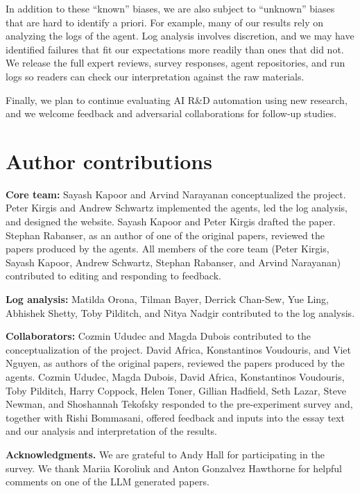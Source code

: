 In addition to these ``known'' biases, we are also subject to ``unknown''
biases that are hard to identify a priori. For example, many of our results
rely on analyzing the logs of the agent. Log analysis involves discretion, and
we may have identified failures that fit our expectations more readily than
ones that did not. We release the full expert reviews, survey responses, agent
repositories, and run logs so readers can check our interpretation against the
raw materials.

Finally, we plan to continue evaluating AI R\&D automation using new research, and we welcome feedback and adversarial collaborations for follow-up studies.

\section*{Author contributions}


\textbf{Core team:} Sayash Kapoor and Arvind Narayanan conceptualized the
project. Peter Kirgis and Andrew Schwartz implemented the agents, led the log
analysis, and designed the website. Sayash Kapoor and Peter Kirgis drafted the
paper. Stephan Rabanser, as an author of one of the original papers, reviewed
the papers produced by the agents. All members of the core team (Peter Kirgis,
Sayash Kapoor, Andrew Schwartz, Stephan Rabanser, and Arvind Narayanan)
contributed to editing and responding to feedback.

\textbf{Log analysis:} Matilda Orona, Tilman Bayer, Derrick Chan-Sew, Yue Ling,
Abhishek Shetty, Toby Pilditch, and Nitya Nadgir contributed to the log
analysis.

\textbf{Collaborators:} Cozmin Ududec and Magda Dubois contributed to the
conceptualization of the project. David Africa, Konstantinos Voudouris, and
Viet Nguyen, as authors of the original papers, reviewed the papers produced by
the agents. Cozmin Ududec, Magda Dubois, David Africa, Konstantinos Voudouris,
Toby Pilditch, Harry Coppock, Helen Toner, Gillian Hadfield, Seth Lazar, Steve
Newman, and Shoshannah Tekofsky responded to the pre-experiment survey and,
together with Rishi Bommasani, offered feedback and inputs into the essay text
and our analysis and interpretation of the results.



\textbf{Acknowledgments.} We are grateful to Andy Hall for participating in the survey. We thank Mariia Koroliuk and Anton Gonzalvez Hawthorne for helpful comments on one of the LLM generated papers. 

